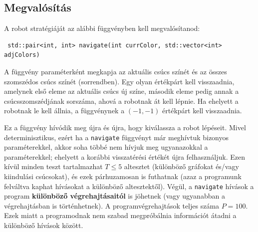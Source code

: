 \documentclass[12pt]{article}
\begin{document}
\subsection{Megvalósítás}

A robot stratégiáját az alábbi függvényben kell megvalósítanod:
\begin{lstlisting}
 std::pair<int, int> navigate(int currColor, std::vector<int> adjColors)
\end{lstlisting}

A függvény paraméterként megkapja az aktuális csúcs színét és az összes szomszédos csúcs színét (sorrendben). Egy olyan értékpárt kell visszaadnia, amelynek első eleme az aktuális csúcs új színe, második eleme pedig annak a csúcsszomszédjának sorszáma, ahová a robotnak át kell lépnie. Ha ehelyett a robotnak le kell állnia, a függvénynek a $(-1, -1)$ értékpárt kell visszaadnia.

Ez a függvény hívódik meg újra és újra, hogy kiválassza a robot lépéseit. Mivel determinisztikus, ezért ha a \texttt{navigate} függvényt már meghívtuk bizonyos paraméterekkel, akkor soha többé nem hívjuk meg ugyanazokkal a paraméterekkel; ehelyett a korábbi visszatérési értékét újra felhasználjuk. Ezen kívül minden teszt tartalmazhat $T \leq 5$ altesztet (különböző gráfokat és/vagy kiindulási csúcsokat), és ezek párhuzamosan is futhatnak (azaz a programunk felváltva kaphat hívásokat a különböző altesztektől). Végül, a \texttt{navigate} hívások a program \textbf{különböző végrehajtásaitól} is jöhetnek (vagy ugyanabban a végrehajtásban is történhetnek). A programvégrehajtások teljes száma $P = 100$. Ezek miatt a programodnak nem szabad megpróbálnia információt átadni a különböző hívások között.
\end{document}
